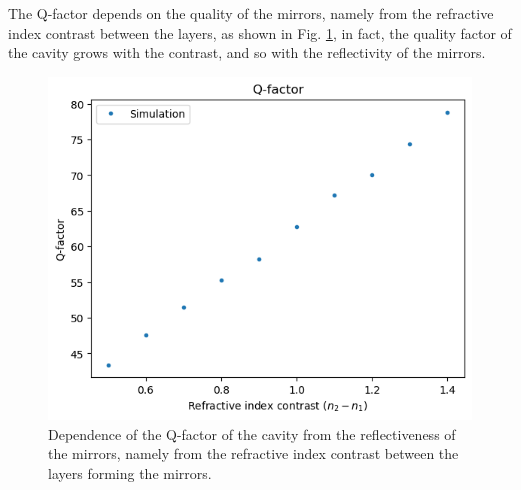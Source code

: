 The Q-factor depends on the quality of the mirrors, namely from the refractive index contrast between the layers, as shown in Fig. \ref{fig:bragg_cavity_qfactor_vs_index}, in fact, the quality factor of the cavity grows with the contrast, and so with the reflectivity of the mirrors.

\begin{figure}[H]
    \centering
    \includegraphics[width=0.6\linewidth]{Figures/bragg_cavity_qfactor_vs_index.png}
    \caption{Dependence of the Q-factor of the cavity from the reflectiveness of the mirrors, namely from the refractive index contrast between the layers forming the mirrors.}
    \label{fig:bragg_cavity_qfactor_vs_index}
\end{figure}